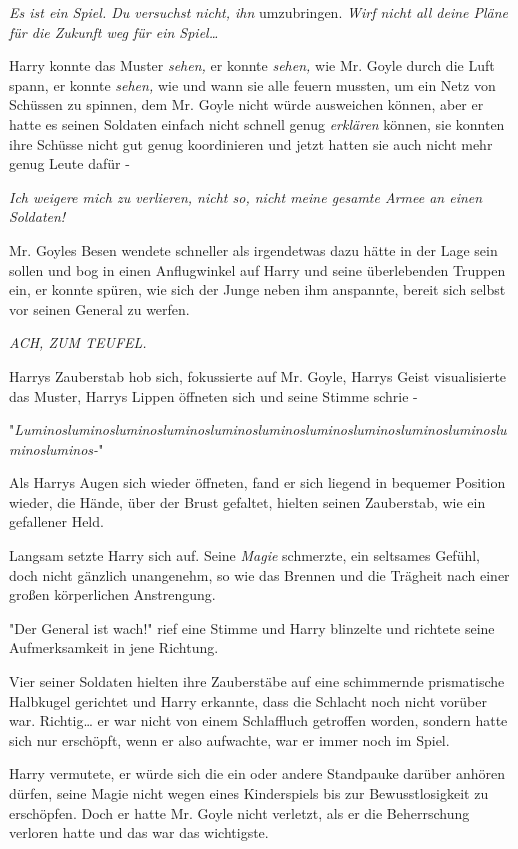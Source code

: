 {\emph{Es ist ein Spiel. Du versuchst nicht, ihn} umzubringen. \emph{Wirf nicht all deine Pläne für die Zukunft weg für ein Spiel…}

Harry konnte das Muster \emph{sehen,} er konnte \emph{sehen,} wie Mr. Goyle durch die Luft spann, er konnte \emph{sehen,} wie und wann sie alle feuern mussten, um ein Netz von Schüssen zu spinnen, dem Mr. Goyle nicht würde ausweichen können, aber er hatte es seinen Soldaten einfach nicht schnell genug \emph{erklären} können, sie konnten ihre Schüsse nicht gut genug koordinieren und jetzt hatten sie auch nicht mehr genug Leute dafür -

\emph{Ich weigere mich zu verlieren, nicht so, nicht meine gesamte Armee an einen Soldaten!}

Mr. Goyles Besen wendete schneller als irgendetwas dazu hätte in der Lage sein sollen und bog in einen Anflugwinkel auf Harry und seine überlebenden Truppen ein, er konnte spüren, wie sich der Junge neben ihm anspannte, bereit sich selbst vor seinen General zu werfen.

\emph{ACH, ZUM TEUFEL.}

Harrys Zauberstab hob sich, fokussierte auf Mr. Goyle, Harrys Geist visualisierte das Muster, Harrys Lippen öffneten sich und seine Stimme schrie -

"\emph{Luminosluminosluminosluminosluminosluminosluminosluminosluminosluminosluminosluminos-}"

\later

Als Harrys Augen sich wieder öffneten, fand er sich liegend in bequemer Position wieder, die Hände, über der Brust gefaltet, hielten seinen Zauberstab, wie ein gefallener Held.

Langsam setzte Harry sich auf. Seine \emph{Magie} schmerzte, ein seltsames Gefühl, doch nicht gänzlich unangenehm, so wie das Brennen und die Trägheit nach einer großen körperlichen Anstrengung.

"Der General ist wach!" rief eine Stimme und Harry blinzelte und richtete seine Aufmerksamkeit in jene Richtung.

Vier seiner Soldaten hielten ihre Zauberstäbe auf eine schimmernde prismatische Halbkugel gerichtet und Harry erkannte, dass die Schlacht noch nicht vorüber war. Richtig… er war nicht von einem Schlaffluch getroffen worden, sondern hatte sich nur erschöpft, wenn er also aufwachte, war er immer noch im Spiel.

Harry vermutete, er würde sich die ein oder andere Standpauke darüber anhören dürfen, seine Magie nicht wegen eines Kinderspiels bis zur Bewusstlosigkeit zu erschöpfen. Doch er hatte Mr. Goyle nicht verletzt, als er die Beherrschung verloren hatte und das war das wichtigste.

}
